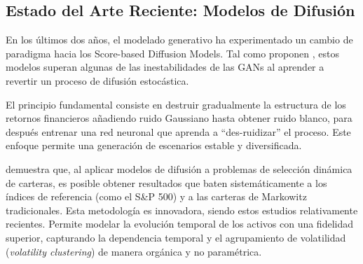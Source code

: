 \subsection{Estado del Arte Reciente: Modelos de Difusión}

En los últimos dos años, el modelado generativo ha experimentado un cambio de paradigma hacia los Score-based Diffusion Models. Tal como proponen \cite{aghapour2025solving}, estos modelos superan algunas de las inestabilidades de las GANs al aprender a revertir un proceso de difusión estocástica.

El principio fundamental consiste en destruir gradualmente la estructura de los retornos financieros añadiendo ruido Gaussiano hasta obtener ruido blanco, para después entrenar una red neuronal que aprenda a ``des-ruidizar'' el proceso. Este enfoque permite una generación de escenarios estable y diversificada.

\cite{aghapour2025solving} demuestra que, al aplicar modelos de difusión a problemas de selección dinámica de carteras, es posible obtener resultados que baten sistemáticamente a los índices de referencia (como el S\&P 500) y a las carteras de Markowitz tradicionales. Esta metodología es innovadora, siendo estos estudios relativamente recientes. Permite modelar la evolución temporal de los activos con una fidelidad superior, capturando la dependencia temporal y el agrupamiento de volatilidad (\textit{volatility clustering}) de manera orgánica y no paramétrica.
